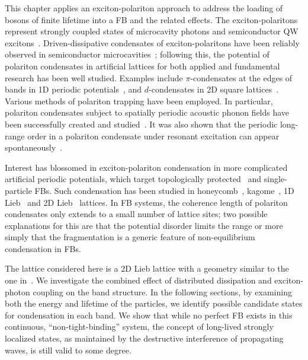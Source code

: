 This chapter applies an exciton-polariton approach to address the loading of bosons of finite lifetime into a FB and the related effects.
The exciton-polaritons represent strongly coupled states of microcavity photons and semiconductor QW excitons~\cite{Kavokin:2017aa}.
Driven-dissipative condensates of exciton-polaritons have been reliably observed in semiconductor microcavities~\cite{Kasprzak:2006aa,Balili:2007aa}; following this,
the potential of polariton condensates in artificial lattices for both applied and fundamental research has been well studied.
Examples include $\pi$-condensates at the edges of bands in 1D periodic potentials~\cite{Lai:2007aa}, and $d$-condensates in 2D square lattices~\cite{Kim:2011aa}.
Various methods of polariton trapping have been employed.
In particular, polariton condensates subject to spatially periodic acoustic phonon fields have been successfully created and studied~\cite{Cerda-Mendez:2010aa,Cerda-Mendez:2013aa}.
It was also shown that the periodic long-range order in a polariton condensate under resonant excitation can appear spontaneously~\cite{Gavrilov:2018aa}.

Interest has blossomed in exciton-polariton condensation in more complicated artificial periodic potentials, which target topologically protected~\cite{Karzig:2015aa,Nalitov:2015aa,Bardyn:2015aa,St-Jean:2017aa,Li:2018aa,Solnyshkov:2018aa} and single-particle FBs.
Such condensation has been studied in honeycomb~\cite{Jacqmin:2014aa}, kagome~\cite{Masumoto:2012aa,Gulevich:2016aa}, 1D Lieb~\cite{Baboux:2016aa} and 2D Lieb~\cite{Klembt:2017aa,Whittaker:2018ab} lattices.
In FB systems, the coherence length of polariton condensates only extends to a small number of lattice sites; two possible explanations for this are that the potential disorder limits the range or more simply that the fragmentation is a generic feature of non-equilibrium condensation in FBs.

The lattice considered here is a 2D Lieb lattice with a geometry similar to the one in~\cite{Klembt:2017aa}.
We investigate the combined effect of distributed dissipation and exciton-photon coupling on the band structure.
In the following sections, by examining both the energy and lifetime of the particles, we identify possible candidate states for condensation in each band. We show that while no perfect FB exists in this continuous, ``non-tight-binding'' system, the concept of long-lived strongly localized states, as maintained by the destructive interference of propagating waves, is still valid to some degree.

